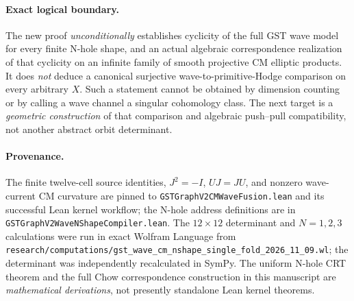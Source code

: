 \documentclass[11pt]{article}
\begin{document}
\paragraph{Exact logical boundary.}
The new proof \emph{unconditionally} establishes cyclicity of the full GST wave model for every finite N-hole shape, and an actual algebraic correspondence realization of that cyclicity on an infinite family of smooth projective CM elliptic products. It does \emph{not} deduce a canonical surjective wave-to-primitive-Hodge comparison on every arbitrary \(X\). Such a statement cannot be obtained by dimension counting or by calling a wave channel a singular cohomology class. The next target is a \emph{geometric construction} of that comparison and algebraic push--pull compatibility, not another abstract orbit determinant.

\paragraph{Provenance.}
The finite twelve-cell source identities, \(J^2=-I\), \(UJ=JU\), and nonzero wave-current CM curvature are pinned to
\texttt{GSTGraphV2CMWaveFusion.lean} and its successful Lean kernel workflow;
the N-hole address definitions are in \texttt{GSTGraphV2WaveNShapeCompiler.lean}.
The \(12\times12\) determinant and \(N=1,2,3\) calculations were run in exact
Wolfram Language from \texttt{research/computations/gst\_wave\_cm\_nshape\_single\_fold\_2026\_11\_09.wl}; the determinant was independently recalculated in SymPy. The uniform N-hole CRT theorem and the full Chow correspondence construction in this manuscript are \emph{mathematical derivations}, not presently standalone Lean kernel theorems.
\end{document}
